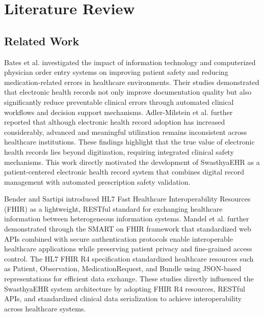 \documentclass[12pt, a4paper]{report}
\numberwithin{equation}{chapter}
\begin{document}
\chapter{Literature Review}

\section{Related Work}

Bates et al. \cite{bates1,bates2} investigated the impact of information technology and computerized physician order entry systems on improving patient safety and reducing medication-related errors in healthcare environments. Their studies demonstrated that electronic health records not only improve documentation quality but also significantly reduce preventable clinical errors through automated clinical workflows and decision support mechanisms. Adler-Milstein et al. \cite{adler} further reported that although electronic health record adoption has increased considerably, advanced and meaningful utilization remains inconsistent across healthcare institutions. These findings highlight that the true value of electronic health records lies beyond digitization, requiring integrated clinical safety mechanisms. This work directly motivated the development of SwasthyaEHR as a patient-centered electronic health record system that combines digital record management with automated prescription safety validation.

Bender and Sartipi \cite{bender} introduced HL7 Fast Healthcare Interoperability Resources (FHIR) as a lightweight, RESTful standard for exchanging healthcare information between heterogeneous information systems. Mandel et al. \cite{mandel} further demonstrated through the SMART on FHIR framework that standardized web APIs combined with secure authentication protocols enable interoperable healthcare applications while preserving patient privacy and fine-grained access control. The HL7 FHIR R4 specification \cite{hl7spec} standardized healthcare resources such as Patient, Observation, MedicationRequest, and Bundle using JSON-based representations for efficient data exchange. These studies directly influenced the SwasthyaEHR system architecture by adopting FHIR R4 resources, RESTful APIs, and standardized clinical data serialization to achieve interoperability across healthcare systems.
\end{document}
